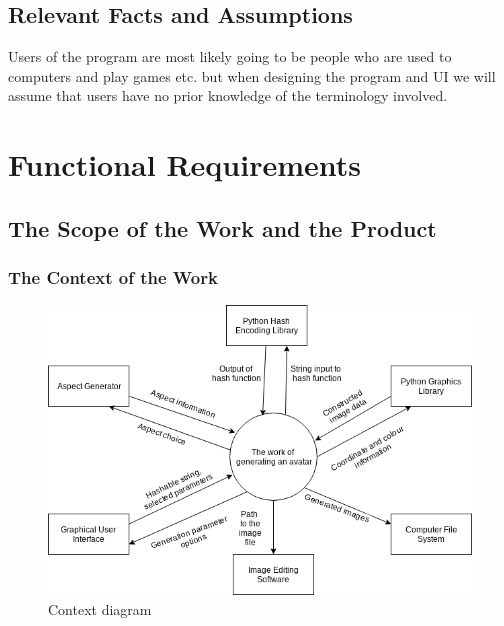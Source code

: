 \documentclass[12pt, titlepage]{article}
\begin{document}
\subsection{Relevant Facts and Assumptions}
Users of the program are most likely going to be people who are used to computers and play games etc. but when designing the program and UI we will assume that users have no prior knowledge of the terminology involved.



\section{Functional Requirements}

\subsection{The Scope of the Work and the Product}
\subsubsection{The Context of the Work}
\begin{figure}[h]
  \includegraphics[scale=0.7]{3xa3contextdiagram}
  \caption{Context diagram}
  \label{fig:context}
\end{figure}
\newpage
\end{document}
